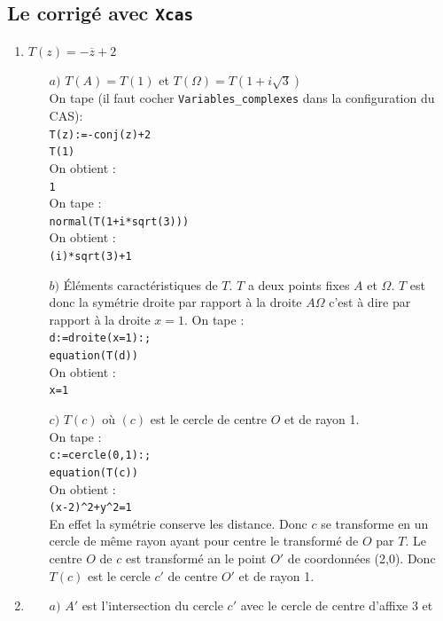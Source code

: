 \documentclass[a4paper,11pt]{book}
\begin{document}
\subsection{Le corrig\'e avec {\tt Xcas}}
\begin{enumerate}
\item $T(z)=-\overline{z}+2$
\begin{itemize}
\item[$a)$]  $T(A)=T(1)$ et $T(\Omega)=T(1+i\sqrt 3)$ \\
On tape (il faut cocher {\tt Variables\_complexes} dans la configuration du CAS):\\
{\tt T(z):=-conj(z)+2}\\
{\tt T(1)}\\
On obtient :\\
{\tt 1}\\    
On tape :\\
{\tt normal(T(1+i*sqrt(3)))}\\
On obtient :\\
{\tt (i)*sqrt(3)+1}     
\item[$b)$] \'El\'ements caract\'eristiques de $T$.
$T$ a deux points fixes $A$ et $\Omega$. $T$ est donc la sym\'etrie droite par 
rapport \`a la droite $A\Omega$ c'est \`a dire par rapport \`a la droite $x=1$.
On tape :\\
{\tt d:=droite(x=1):;}\\
{\tt equation(T(d))}\\
On obtient :\\
{\tt  x=1}       
\item[$c)$] $T(c)$ o\`u  $(c)$  est le cercle de centre $O$ et de rayon 1.\\
On tape :\\
{\tt c:=cercle(0,1):;}\\
{\tt equation(T(c))}\\
On obtient :\\
{\tt (x-2)\verb|^|2+y\verb|^|2=1}\\     
En effet la sym\'etrie conserve les distance. Donc $c$ se transforme en un 
cercle de m\^eme rayon ayant pour centre le transform\'e de $O$ par $T$. Le
centre $O$ de $c$ est transform\'e an le point $O'$ de coordonn\'ees (2,0). 
Donc $T(c)$ est le cercle $c'$ de centre $O'$ et de rayon 1.   
\end{itemize}
\item
\begin{itemize}
\item[$a)$] 
$A'$ est l'intersection du cercle $c'$ avec le cercle de centre d'affixe 3 et 

\end{itemize}
\end{enumerate}
\end{document}
